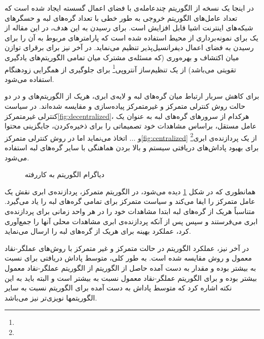 در اینجا یک نسخه از الگوریتم چندعامله‌ی  با فضای اعمال گسسته ایجاد شده است که تعداد عامل‌های الگوریتم خروجی به طور خطی با تعداد گره‌های لبه و حسگرهای شبکه‌های اینترنت اشیا قابل افزایش است. برای رسیدن به این هدف، در این مقاله از یک  برای نمونه‌برداری از محیط استفاده شده است که پارامترهای مربوط به آن را برای رسیدن به فضای اعمال دیفرانسیل‌پذیر تنظیم می‌نماید. در آخر نیز برای برقرای توازن میان اکتشاف و بهره‌وری (که مسئله‌ی مشترک میان تمامی الگوریتم‌های یادگیری تقویتی می‌باشد) از یک تنظیم‌ساز آنتروپی\footnote{} برای جلوگیری از همگرایی زودهنگام استفاده می‌شود.

برای کاهش سربار ارتباط میان گره‌های لبه و لایه‌ی ابری، هریک از الگوریتم‌های  و  در دو حالت روش کنترلی متمرکز و غیرمتمرکز پیاده‌سازی و مقایسه شده‌اند. در سیاست کنترلی غیرمتمرکز\ref{fig:decentralized}، هرکدام از سرورهای گره‌های لبه به عنوان یک عامل مستقل، براساس مشاهدات خود تصمیماتی را برای ذخیره‌کردن، جایگزینی محتوا و ... اتخاذ می‌نماید اما در روش کنترلی متمرکز\ref{fig:centralized} از یک پردازنده‌ی ابری\footnote{} برای بهبود پاداش‌های دریافتی سیستم و بالا بردن هماهنگی با سایر گره‌های لبه استفاده می‌شود.

\begin{figure}[ht]
	\centering 
	\hspace{10mm}
	\caption{دیاگرام الگوریتم  به کاررفته}
	\label{fig:centralizedvsdec} %
\end{figure}
\pagebreak

همانطوری که در شکل \ref{fig:centralizedvsdec} دیده می‌شود، در الگوریتم متمرکز، پردازنده‌ی ابری نقش یک عامل متمرکز را ایفا می‌کند و سیاست متمرکز برای تمامی گره‌های لبه را یاد می‌گیرد. متناسباً هریک از گره‌های لبه ابتدا مشاهدات خود را در هر واحد زمانی برای پردازنده‌ی ابری می‌فرستند و سپس پس از آنکه پردازنده‌ی ابری مشاهدات محلی آنها را جمع‌آوری کرد، عملکرد بهینه برای هریک از گره‌های لبه را ارسال می‌نماید. 

در آخر نیز، عملکرد الگوریتم  در حالت متمرکز و غیر متمرکز با روش‌های عملگر-نقاد معمول و روش  مقایسه شده است. به طور کلی، متوسط پاداش دریافتی برای  نسبت به  بیشتر بوده و مقدار به دست آمده حاصل از الگوریتم  از الگوریتم عملگر-نقاد معمول بیشتر بوده و برای الگوریتم عملگر-نقاد معمول نسبت به  بیشتر است و البته باید به این نکته اشاره کرد که متوسط پاداش به دست آمده برای الگوریتم  نسبت به سایر الگوریتمها نویزی‌تر نیز می‌باشد. 


